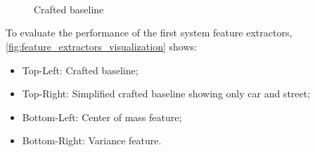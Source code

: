     \begin{figure}[H]
          \centering
          \caption{
        Crafted baseline}
          \label{fig:crafted_baseline}
            \\
            \\
            \\
    \end{figure}
    
    To evaluate the performance of the first system feature extractors, \autoref{fig:feature_extractors_visualization} shows:
    
    \begin{itemize}
        \item Top-Left: Crafted baseline;
        \item Top-Right: Simplified crafted baseline showing only car and street;
        \item Bottom-Left: Center of mass feature;
        \item Bottom-Right: Variance feature.
    \end{itemize}
    
